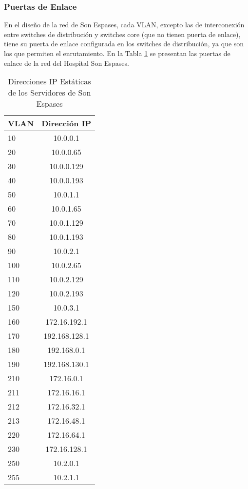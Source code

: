 \subsubsection{Puertas de Enlace}
En el diseño de la red de Son Espases, cada VLAN, excepto las de interconexión entre switches de distribución y switches core (que no tienen puerta de enlace), tiene su puerta de enlace configurada en los switches de distribución, ya que son los que permiten el enrutamiento. En la Tabla \ref{tab:GatewaysSE} se presentan las puertas de enlace de la red del Hospital Son Espases.
\begin{table}[H]
    \centering
    \scriptsize
    \begin{tabular}{|l|c|}
        \hline
        \textbf{VLAN} & \textbf{Dirección IP} \\
        \hline
        10 & 10.0.0.1 \\
        \hline
        20 & 10.0.0.65 \\
        \hline
        30 & 10.0.0.129 \\
        \hline
        40 & 10.0.0.193 \\
        \hline
        50 & 10.0.1.1 \\
        \hline
        60 & 10.0.1.65 \\
        \hline
        70 & 10.0.1.129 \\
        \hline
        80 & 10.0.1.193 \\
        \hline
        90 & 10.0.2.1 \\
        \hline
        100 & 10.0.2.65 \\
        \hline
        110 & 10.0.2.129 \\
        \hline
        120 & 10.0.2.193 \\
        \hline
        150 & 10.0.3.1 \\
        \hline
        160 & 172.16.192.1 \\
        \hline
        170 & 192.168.128.1 \\
        \hline
        180 & 192.168.0.1 \\
        \hline
        190 & 192.168.130.1 \\
        \hline
        210 & 172.16.0.1 \\
        \hline
        211 & 172.16.16.1 \\
        \hline
        212 & 172.16.32.1 \\
        \hline
        213 & 172.16.48.1 \\
        \hline
        220 & 172.16.64.1 \\
        \hline
        230 & 172.16.128.1 \\
        \hline
        250 & 10.2.0.1 \\
        \hline
        255 & 10.2.1.1 \\
        \hline
    \end{tabular}
    \caption{Direcciones IP Estáticas de los Servidores de Son Espases}
    \label{tab:GatewaysSE}
\end{table}

